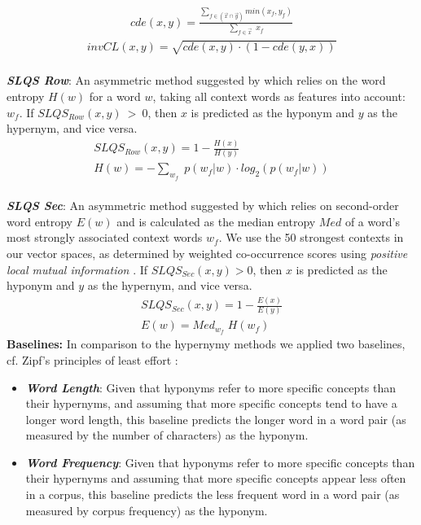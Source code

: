 \documentclass[11pt,a4paper]{article}
\begin{document}
\vspace{-1mm}
\begin{align*}
  cde(x,y) = \frac{\sum_{f \in (\overrightarrow{x} \cap \overrightarrow{y})} min(x_f,y_f)}{\sum_{f \in \overrightarrow{x}} \; x_f} 
\end{align*}
%
\vspace{-2mm}
\begin{align*}
  invCL(x,y) = \sqrt{cde(x,y) \cdot (1-cde(y,x))}
\end{align*}
\vspace{+1mm}\\
\textit{\textbf{SLQS Row}}: An asymmetric method suggested by
 which relies on the word entropy $H(w)$ for a
word $w$, taking all context words as features into account: $w_f$. If
$SLQS_{Row}(x,y)~>~0$, then $x$ is predicted as the hyponym and $y$ as
the hypernym, and vice versa.
\begin{align*}    
  SLQS_{Row}(x,y) = 1-\frac{H(x)}{H(y)}\\
  H(w) = -\sum_{w_f} \; p(w_f|w) \cdot log_{2}(p(w_f|w))
\end{align*}
\vspace{+1mm}\\
\textit{\textbf{SLQS Sec}}: An asymmetric method suggested by
 which relies on second-order word entropy
$E(w)$ and is calculated as the median entropy $Med$ of a word's most
strongly associated context words $w_f$. We use the 50 strongest
contexts in our vector spaces, as determined by weighted co-occurrence
scores using \textit{positive local mutual information}
\cite{Evert:05}. If $SLQS_{Sec}(x,y) > 0$, then $x$ is predicted as
the hyponym and $y$ as the hypernym, and vice versa.
\begin{align*}
  SLQS_{Sec}(x,y) = 1-\frac{E(x)}{E(y)}\\
  E(w) = Med_{w_f} \; H(w_f)
\end{align*}
%
\textbf{Baselines:} In comparison to the hypernymy methods we applied
two baselines, cf. Zipf's principles of least effort \citep{zipf49}:
\begin{itemize}
\item \textit{\textbf{Word Length}}: Given that hyponyms refer to more
specific concepts than their hypernyms, and assuming that more
specific concepts tend to have a longer word length, this baseline
predicts the longer word in a word pair (as measured by the number of
characters) as the hyponym.
\item \textit{\textbf{Word Frequency}}: Given that hyponyms refer to more
specific concepts than their hypernyms and assuming that more specific
concepts appear less often in a corpus, this baseline predicts the
less frequent word in a word pair (as measured by corpus frequency) as
the hyponym.
\end{itemize}
\end{document}
